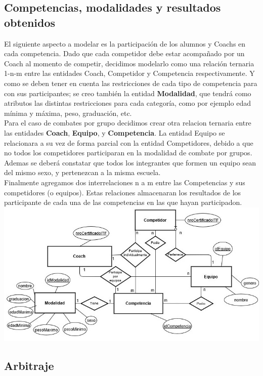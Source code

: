 \newpage
\subsection{Competencias, modalidades y resultados obtenidos}

El siguiente aspecto a modelar es la participación de los alumnos y Coachs en cada competencia. Dado que cada competidor debe estar acompañado por un Coach al momento de competir, decidimos modelarlo como una relación ternaria 1-n-m entre las entidades Coach, Competidor y Competencia respectivamente. Y como se deben tener en cuenta las restricciones de cada tipo de competencia para con sus participantes; se creo también la entidad \textbf{Modalidad}, que tendrá como atributos las distintas restricciones para cada categoría, como por ejemplo edad mínima y máxima, peso, graduación, etc.\\

Para el caso de combates por grupo decidimos crear otra relacion ternaria entre las entidades \textbf{Coach}, \textbf{Equipo}, y \textbf{Competencia}. La entidad Equipo se relacionara a su vez de forma parcial con la entidad Competidores, debido a que no todos los competidores participaran en la modalidad de combate por grupos. Ademas se deberá constatar que todos los integrantes que formen un equipo  sean del mismo sexo, y pertenezcan a la misma escuela.\\

Finalmente agregamos dos interrelaciones n a m entre las Competencias y sus competidores (o equipos). Estas relaciones almacenaran los resultados de los participante de cada una de las competencias en las que hayan participadon.\\

\includegraphics[scale=0.75]{competenciaDiag.jpg}


\subsection{Arbitraje}

